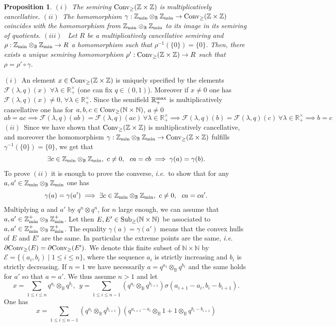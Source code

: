 \documentclass[noams,lp]{compositio}
\newtheorem{prop}[thm]{Proposition}
\def\B{{\mathbb B}}
\def\N{{\mathbb N}}
\def\R{{\mathbb R}}
\def\Z{{\mathbb Z}}
\def\cE{{\mathcal E}}
\def\cF{{\mathcal F}}
\def\sub{{\rm Sub}_\geq}
\def\conv{{\rm Conv}_\geq}
\newcommand{\ie}{{\it i.e.\/}\ }
\def\zmin{\Z_{\rm min}}
\def\rmax{\R_+^{\rm max}}
\def\nbo{{\zmin\otimes_\B \zmin}}
\def\nboplus{{\zmin^+\otimes_\B \zmin^+}}
\begin{document}
\begin{prop}\label{conv}
$(i)$~The semiring $\conv(\Z\times \Z)$ is multiplicatively cancellative.\newline
$(ii)$~The homomorphism $\gamma:\nbo\to\conv(\Z\times \Z)$ coincides with the homomorphism from $\nbo$ to its image in its semiring of quotients. \newline
$(iii)$~
Let $R$ be a multiplicatively cancellative semiring and $\rho:\nbo\to R$
a homomorphism such that $\rho^{-1}(\{0\})=\{0\}$. Then, there exists a unique semiring homomorphism $\rho':\conv(\Z\times \Z)\to R$ such that 
$\rho=\rho'\circ \gamma$.
\end{prop}
\proof $(i)$~An element $x\in\conv(\Z\times \Z)$ is uniquely specified by the elements $\cF(\lambda,q)(x)$ $\forall\lambda \in \R_+^\times$ (one can fix $q\in (0,1)$). Moreover if $x\neq 0$ one has $\cF(\lambda,q)(x)\neq 0$, $\forall \lambda \in \R_+^\times$. Since the semifield $\rmax$ is multiplicatively cancellative  one has for $a,b,c\in\conv(\N\times \N)$, $a\neq 0$
$$
ab=ac\implies \cF(\lambda,q)(ab)= \cF(\lambda,q)(ac)~ \forall\lambda \in \R_+^\times\implies 
 \cF(\lambda,q)(b)= \cF(\lambda,q)(c)~\forall\lambda \in \R_+^\times\implies b=c
$$
$(ii)$~Since we have shown that $\conv(\Z\times \Z)$ is multiplicatively cancellative, and moreover the homomorphism $\gamma:\nbo\to\conv(\Z\times \Z)$ fulfills $\gamma^{-1}(\{0\})=\{0\}$, we get that 
$$
 \exists c\in \nbo, \  c\neq 0, \  \  ca=cb \implies \gamma(a)=\gamma(b).
$$
To prove $(ii)$  it is enough to prove the converse, \ie to show that for any $a,a'\in\nbo$ one has
$$
\gamma(a)=\gamma(a')\implies \exists c\in \nbo, \  c\neq 0, \  \  ca=ca'.
$$
Multiplying $a$ and $a'$ by $q^n\otimes  q^n$, for $n$ large enough, we can assume that $a,a'\in \nboplus$. 
Let then $E,E'\in \sub(\N\times \N)$ be associated to $a,a'\in \nboplus$. The equality $\gamma(a)=\gamma(a')$ means that the convex hulls of $E$ and $E'$ are the same. In particular the extreme points are the same, \ie 
$
\partial \conv(E)=\partial \conv(E').
$
We denote this finite subset of $\N\times \N$ by $\cE=\{(a_i,b_i)\mid 1\leq i\leq n\}$, where the sequence $a_i$ is strictly increasing and $b_i$ is strictly decreasing. If $n=1$ we have necessarily $a=q^{a_1}\otimes_\B q^{b_1}$ and the same holds for $a'$ so that $a=a'$. We thus assume $n>1$ and let 
$$
x=\sum_{1\leq i\leq n}q^{a_i}\otimes_\B q^{b_i}, \  \  y=\sum_{1\leq i\leq n-1}(q^{a_i}\otimes_\B q^{b_{i+1}})\sigma(a_{i+1}-a_i,b_i-b_{i+1}).
$$
One has 
$$
x=\sum_{1\leq i\leq n-1}(q^{a_i}\otimes_\B q^{b_{i+1}})\left(q^{a_{i+1}-a_i}\otimes_\B 1+ 1 \otimes_\B q^{b_i-b_{i+1}}\right)
$$
\end{document}
